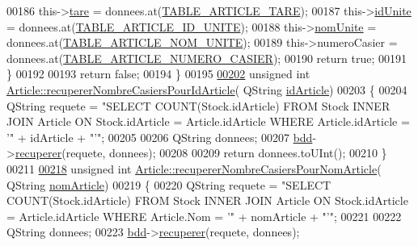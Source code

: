 \begin{DoxyCode}
00186         this->\hyperlink{class_article_abacf2d29d4b2e3e7b49256bc48d5fe64}{tare} = donnees.at(\hyperlink{_article_8h_a159354683cfd6e1b578172fbe6490ab6a970d883b74adb323da887e30bef922f5}{TABLE\_ARTICLE\_TARE});
00187         this->\hyperlink{class_article_a702cff16cb9cd0774383ceba81d83869}{idUnite} = donnees.at(\hyperlink{_article_8h_a159354683cfd6e1b578172fbe6490ab6aa27f54cec32c08b45beaf39f1259ae92}{TABLE\_ARTICLE\_ID\_UNITE});
00188         this->\hyperlink{class_article_a43a20e248e57150af0546c9f4b6b74c3}{nomUnite} = donnees.at(\hyperlink{_article_8h_a159354683cfd6e1b578172fbe6490ab6abc2184dab6c03e59872ced7183608174}{TABLE\_ARTICLE\_NOM\_UNITE});
00189         this->numeroCasier = donnees.at(\hyperlink{_article_8h_a159354683cfd6e1b578172fbe6490ab6a43ae9bea39dd3f12e8732bcd2d7c0223}{TABLE\_ARTICLE\_NUMERO\_CASIER});
00190         \textcolor{keywordflow}{return} \textcolor{keyword}{true};
00191     \}
00192 
00193     \textcolor{keywordflow}{return} \textcolor{keyword}{false};
00194 \}
00195 
\hyperlink{class_article_a537f0aa471a7466425b6abf6c34058d6}{00202} \textcolor{keywordtype}{unsigned} \textcolor{keywordtype}{int} \hyperlink{class_article_a537f0aa471a7466425b6abf6c34058d6}{Article::recupererNombreCasiersPourIdArticle}(
      QString \hyperlink{class_article_a9f2f7a04139f26accec145066a5aacae}{idArticle})
00203 \{
00204     QString requete = \textcolor{stringliteral}{"SELECT COUNT(Stock.idArticle) FROM Stock INNER JOIN Article ON Stock.idArticle =
       Article.idArticle WHERE Article.idArticle = '"} + idArticle + \textcolor{stringliteral}{"'"};
00205 
00206     QString donnees;
00207     \hyperlink{class_article_a7221cec4212d86d74f479b9ee683ee8a}{bdd}->\hyperlink{class_bdd_a8f25d29d309041bbf875700db0efd97b}{recuperer}(requete, donnees);
00208 
00209     \textcolor{keywordflow}{return} donnees.toUInt();
00210 \}
00211 
\hyperlink{class_article_acdd796ad55a7fde0c229c8c2df7050cc}{00218} \textcolor{keywordtype}{unsigned} \textcolor{keywordtype}{int} \hyperlink{class_article_acdd796ad55a7fde0c229c8c2df7050cc}{Article::recupererNombreCasiersPourNomArticle}(
      QString \hyperlink{class_article_a0ba6c08f7dd54e4b7caf673ecd6b41a6}{nomArticle})
00219 \{
00220     QString requete = \textcolor{stringliteral}{"SELECT COUNT(Stock.idArticle) FROM Stock INNER JOIN Article ON Stock.idArticle =
       Article.idArticle WHERE Article.Nom = '"} + nomArticle + \textcolor{stringliteral}{"'"};
00221 
00222     QString donnees;
00223     \hyperlink{class_article_a7221cec4212d86d74f479b9ee683ee8a}{bdd}->\hyperlink{class_bdd_a8f25d29d309041bbf875700db0efd97b}{recuperer}(requete, donnees);

\end{DoxyCode}
